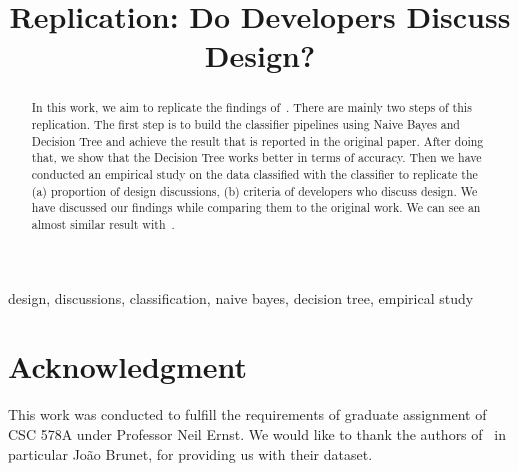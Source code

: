 \documentclass[conference]{IEEEtran}
\begin{document}

\title{Replication: Do Developers Discuss Design?}

\author{
}

\makeatletter
{}
\makeatother

\maketitle

\begin{abstract}
In this work, we aim to replicate the findings of~\cite{Brunet2014a}. There are mainly two steps of this replication. The first step is to build the classifier pipelines using Naive Bayes and Decision Tree and achieve the result that is reported in the original paper. After doing that, we show that the Decision Tree works better in terms of accuracy. Then we have conducted an empirical study on the data classified with the classifier to replicate the (a) proportion of design discussions, (b) criteria of developers who discuss design. We have discussed our findings while comparing them to the original work. We can see an almost similar result with~\cite{Brunet2014a}.  
\end{abstract}

\begin{IEEEkeywords}
design, discussions, classification, naive bayes, decision tree, empirical study
\end{IEEEkeywords}








\section*{Acknowledgment}
This work was conducted to fulfill the requirements of graduate assignment of CSC 578A under Professor Neil Ernst. We would like to thank the authors of~\cite{Brunet2014a} in particular Jo\~{a}o Brunet, for providing us with their dataset. 




\end{document}
